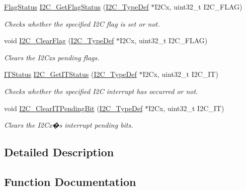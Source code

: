 \begin{DoxyCompactItemize}
\hyperlink{group___exported__types_ga89136caac2e14c55151f527ac02daaff}{Flag\+Status} \hyperlink{group___i2_c___exported___functions_ga15c95d0ed124f029621a2061b1677ee7}{I2\+C\+\_\+\+Get\+Flag\+Status} (\hyperlink{struct_i2_c___type_def}{I2\+C\+\_\+\+Type\+Def} $\ast$I2\+Cx, uint32\+\_\+t I2\+C\+\_\+\+F\+L\+AG)
\begin{DoxyCompactList}\small\item\em Checks whether the specified I2C flag is set or not. \end{DoxyCompactList}\item 
void \hyperlink{group___i2_c___exported___functions_ga9d4f8fe9f7232696114b5578b1223963}{I2\+C\+\_\+\+Clear\+Flag} (\hyperlink{struct_i2_c___type_def}{I2\+C\+\_\+\+Type\+Def} $\ast$I2\+Cx, uint32\+\_\+t I2\+C\+\_\+\+F\+L\+AG)
\begin{DoxyCompactList}\small\item\em Clears the I2\+Cx\textquotesingle{}s pending flags. \end{DoxyCompactList}\item 
\hyperlink{group___exported__types_gaacbd7ed539db0aacd973a0f6eca34074}{I\+T\+Status} \hyperlink{group___i2_c___exported___functions_ga447771fbbd94a56f3570b9f430a069ba}{I2\+C\+\_\+\+Get\+I\+T\+Status} (\hyperlink{struct_i2_c___type_def}{I2\+C\+\_\+\+Type\+Def} $\ast$I2\+Cx, uint32\+\_\+t I2\+C\+\_\+\+IT)
\begin{DoxyCompactList}\small\item\em Checks whether the specified I2C interrupt has occurred or not. \end{DoxyCompactList}\item 
void \hyperlink{group___i2_c___exported___functions_ga110dda440fa200b5f77349df19b3e6bb}{I2\+C\+\_\+\+Clear\+I\+T\+Pending\+Bit} (\hyperlink{struct_i2_c___type_def}{I2\+C\+\_\+\+Type\+Def} $\ast$I2\+Cx, uint32\+\_\+t I2\+C\+\_\+\+IT)
\begin{DoxyCompactList}\small\item\em Clears the I2\+Cx�s interrupt pending bits. \end{DoxyCompactList}\end{DoxyCompactItemize}


\subsection{Detailed Description}


\subsection{Function Documentation}
\mbox{\label{group___i2_c___exported___functions_ga7bb44e894d68a7991f564c43fb187486}} 
